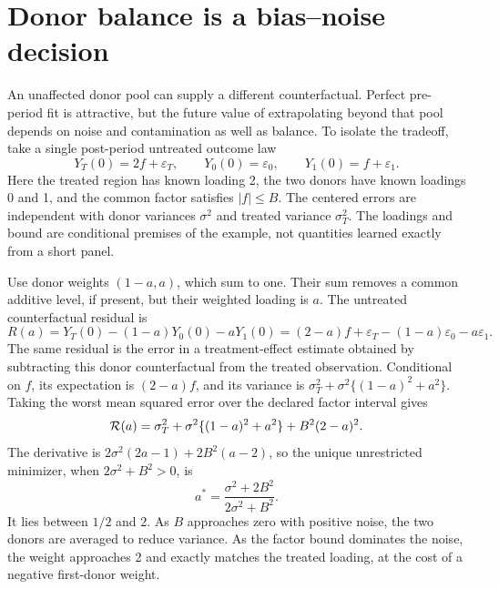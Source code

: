 \section{Donor balance is a bias--noise decision}
\label{exec17:s6-donor}

An unaffected donor pool can supply a different counterfactual. Perfect
pre-period fit is attractive, but the future value of extrapolating beyond
that pool depends on noise and contamination as well as balance. To isolate
the tradeoff, take a single post-period untreated outcome law
\begin{equation}
 Y_T(0)=2f+\varepsilon_T,\qquad
 Y_0(0)=\varepsilon_0,\qquad
 Y_1(0)=f+\varepsilon_1.
 \label{exec17:s6-donor-law}
\end{equation}
Here the treated region has known loading 2, the two donors have known
loadings 0 and 1, and the common factor satisfies $|f|\leq B$.
The centered errors are independent with donor variances $\sigma^2$
and treated variance $\sigma_T^2$. The loadings and bound are conditional
premises of the example, not quantities learned exactly from a short panel.

Use donor weights $(1-a,a)$, which sum to one. Their sum removes a common
additive level, if present, but their weighted loading is $a$. The untreated
counterfactual residual is
\begin{equation}
 R(a)=Y_T(0)-(1-a)Y_0(0)-aY_1(0)
      =(2-a)f+\varepsilon_T-(1-a)\varepsilon_0-a\varepsilon_1.
 \label{exec17:s6-donor-residual}
\end{equation}
The same residual is the error in a treatment-effect estimate obtained by
subtracting this donor counterfactual from the treated observation. Conditional
on $f$, its expectation is $(2-a)f$, and its variance is
$\sigma_T^2+\sigma^2\{(1-a)^2+a^2\}$. Taking the worst mean squared
error over the declared factor interval gives
\begin{equation}
 {\cal R}(a)=\sigma_T^2+\sigma^2\{(1-a)^2+a^2\}
                         +B^2(2-a)^2.
 \label{exec17:s6-donor-risk}
\end{equation}
The derivative is
$2\sigma^2(2a-1)+2B^2(a-2)$, so the unique unrestricted minimizer,
when $2\sigma^2+B^2>0$, is
\begin{equation}
 a^*=\frac{\sigma^2+2B^2}{2\sigma^2+B^2}.
 \label{exec17:s6-donor-optimum}
\end{equation}
It lies between $1/2$ and 2. As $B$ approaches zero with positive
noise, the two donors are averaged to reduce variance. As the factor bound
dominates the noise, the weight approaches 2 and exactly matches the
treated loading, at the cost of a negative first-donor weight.

